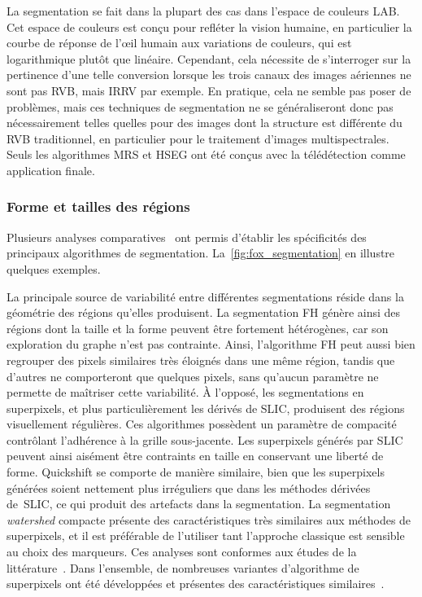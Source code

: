 La segmentation se fait dans la plupart des cas dans l'espace de couleurs \gls{LAB}. Cet espace de couleurs est conçu pour refléter la vision humaine, en particulier la courbe de réponse de l'\oe{}il humain aux variations de couleurs, qui est logarithmique plutôt que linéaire. Cependant, cela nécessite de s'interroger sur la pertinence d'une telle conversion lorsque les trois canaux des images aériennes ne sont pas \gls{RVB}, mais \gls{IRRV} par exemple. En pratique, cela ne semble pas poser de problèmes, mais ces techniques de segmentation ne se généraliseront donc pas nécessairement telles quelles pour des images dont la structure est différente du \gls{RVB} traditionnel, en particulier pour le traitement d'images multispectrales. Seuls les algorithmes \gls{MRS} et \gls{HSEG} ont été conçus avec la télédétection comme application finale.

\subsubsection{Forme et tailles des régions}

Plusieurs analyses comparatives~\cite{neubert_superpixel_2012,achanta_slic_2012,stutz_superpixels_2018} ont permis d'établir les spécificités des principaux algorithmes de segmentation. La~\cref{fig:fox_segmentation} en illustre quelques exemples.

La principale source de variabilité entre différentes segmentations réside dans la géométrie des régions qu'elles produisent. La segmentation \gls{FH} génère ainsi des régions dont la taille et la forme peuvent être fortement hétérogènes, car son exploration du graphe n'est pas contrainte. Ainsi, l'algorithme \gls{FH} peut aussi bien regrouper des pixels similaires très éloignés dans une même région, tandis que d'autres ne comporteront que quelques pixels, sans qu'aucun paramètre ne permette de maîtriser cette variabilité.
À l'opposé, les segmentations en superpixels, et plus particulièrement les dérivés de \gls{SLIC}, produisent des régions visuellement régulières. Ces algorithmes possèdent un paramètre de compacité contrôlant l'adhérence à la grille sous-jacente. Les superpixels générés par \gls{SLIC} peuvent ainsi aisément être contraints en taille en conservant une liberté de forme. Quickshift se comporte de manière similaire, bien que les superpixels générées soient nettement plus irréguliers que dans les méthodes dérivées de~\gls{SLIC}, ce qui produit des artefacts dans la segmentation. La segmentation \emph{watershed} compacte présente des caractéristiques très similaires aux méthodes de superpixels, et il est préférable de l'utiliser tant l'approche classique est sensible au choix des marqueurs. Ces analyses sont conformes aux études de la littérature~\cite{neubert_superpixel_2012,achanta_slic_2012}. Dans l'ensemble, de nombreuses variantes d'algorithme de superpixels ont été développées et présentes des caractéristiques similaires~\cite{stutz_superpixels_2018}.

